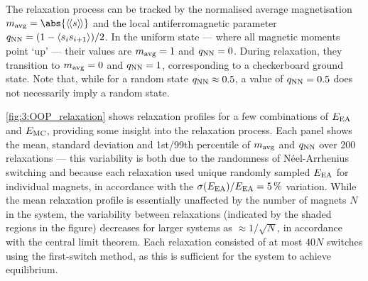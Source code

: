 The relaxation process can be tracked by the normalised average magnetisation $\mavg = \abs{\llangle s \rrangle}$ and the local antiferromagnetic parameter $q_\mathrm{NN} = (1 - \langle s_i s_{i+1} \rangle)/2$.
In the uniform state --- where all magnetic moments point `up' --- their values are $m_\mathrm{avg}=1$ and $q_\mathrm{NN}=0$.
During relaxation, they transition to $m_\mathrm{avg}=0$ and $q_\mathrm{NN}=1$, corresponding to a checkerboard ground state.
Note that, while for a random state $q_\mathrm{NN} \approx 0.5$, a value of $q_\mathrm{NN}=0.5$ does not necessarily imply a random state. \par

\cref{fig:3:OOP_relaxation} shows relaxation profiles for a few combinations of $E_\mathrm{EA}$ and $E_\mathrm{MC}$, providing some insight into the relaxation process.
Each panel shows the mean, standard deviation and 1st/99th percentile of $m_\mathrm{avg}$ and $q_\mathrm{NN}$ over 200 relaxations --- this variability is both due to the randomness of N\'eel-Arrhenius switching and because each relaxation used unique randomly sampled $E_\mathrm{EA}$ for individual magnets, in accordance with the $\sigma(E_\mathrm{EA})/E_\mathrm{EA} = \SI{5}{\percent}$ variation.
While the mean relaxation profile is essentially unaffected by the number of magnets $N$ in the system, the variability between relaxations (indicated by the shaded regions in the figure) decreases for larger systems as $\approx 1/\sqrt{N}$, in accordance with the central limit theorem.
Each relaxation consisted of at most $40N$ switches using the first-switch method, as this is sufficient for the system to achieve equilibrium.

\vspace{-1em}


